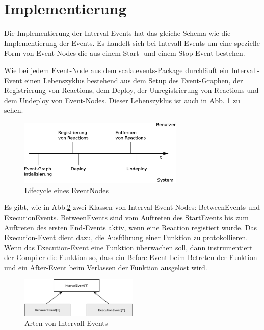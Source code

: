 \section{Implementierung}

Die Implementierung der Interval-Events hat das gleiche Schema wie die
Implementierung der Events. Es handelt sich bei Intevall-Events um eine
spezielle Form von Event-Nodes die aus einem Start- und einem Stop-Event
bestehen.

Wie bei jedem Event-Node aus dem scala.events-Package durchläuft ein
Intervall-Event einen Lebenszyklus bestehend aus dem Setup des Event-Graphen,
der Registrierung von Reactions, dem Deploy, der Unregistrierung von Reactions
und dem Undeploy von Event-Nodes. Dieser Lebenszyklus ist auch in
Abb. \ref{event_node_lifecycle} zu sehen.

\begin{figure}[htp]
\begin{center}
  \includegraphics[width=0.7\textwidth]{graphics/EventNode-Lifecycle}
  \caption{Lifecycle eines EventNodes}
  \label{event_node_lifecycle}
\end{center}
\end{figure}


Es gibt, wie in Abb.\ref{interval_events_structure} zwei Klassen von
Interval-Event-Nodes: BetweenEvents und ExecutionEvents. BetweenEvents sind vom
Auftreten des StartEvents bis zum Auftreten des ersten End-Events aktiv, wenn
eine Reaction registiert wurde. Das Execution-Event dient dazu, die Ausführung
einer Funktion zu protokollieren. Wenn das Execution-Event eine Funktion
überwachen soll, dann instrumentiert der Compiler die Funktion so, dass ein
Before-Event beim Betreten der Funktion und ein After-Event beim Verlassen der
Funktion ausgelöst wird.

\begin{figure}[htp]
\begin{center}
  \includegraphics[width=0.5\textwidth]{graphics/interval_event_structure}
  \caption{Arten von Intervall-Events}
  \label{interval_events_structure}
\end{center}
\end{figure}


